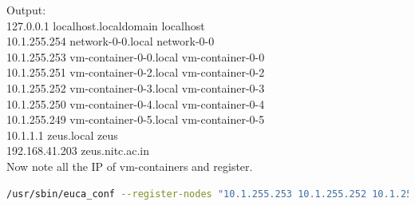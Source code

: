 Output:\\
127.0.0.1    \hspace{6mm}   localhost.localdomain \hspace{6mm}  localhost\\
10.1.255.254  \hspace{6mm}  network-0-0.local   \hspace{6mm}    network-0-0\\
10.1.255.253   \hspace{6mm} vm-container-0-0.local \hspace{6mm} vm-container-0-0\\
10.1.255.251  \hspace{6mm}  vm-container-0-2.local\hspace{6mm}  vm-container-0-2\\
10.1.255.252  \hspace{6mm}  vm-container-0-3.local \hspace{6mm} vm-container-0-3\\
10.1.255.250  \hspace{6mm}  vm-container-0-4.local \hspace{6mm} vm-container-0-4\\
10.1.255.249   \hspace{6mm} vm-container-0-5.local \hspace{6mm} vm-container-0-5\\
10.1.1.1    \hspace{6mm}    zeus.local  \hspace{6mm}    zeus\\
192.168.41.203 \hspace{6mm} zeus.nitc.ac.in\\


Now note all the IP of vm-containers and register.
\begin{lstlisting}[language=bash]
/usr/sbin/euca_conf --register-nodes "10.1.255.253 10.1.255.252 10.1.255.251 10.1.255.250 10.1.255.249"
\end{lstlisting}






